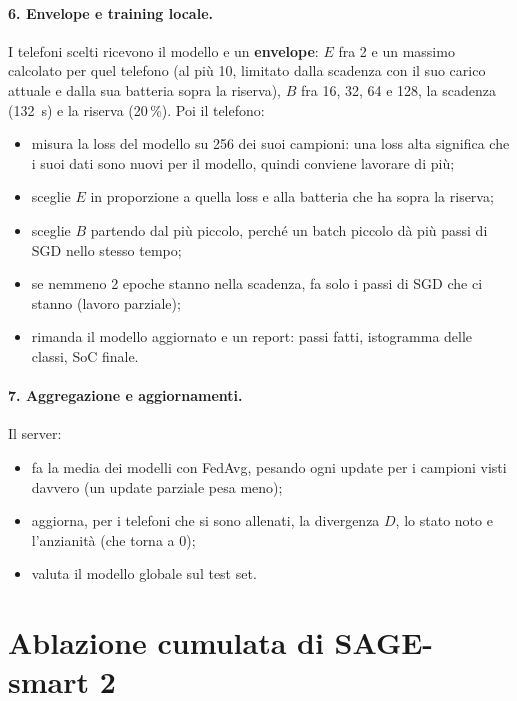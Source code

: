 \documentclass[11pt,a4paper]{article}
\begin{document}
\paragraph{6. Envelope e training locale.}
I telefoni scelti ricevono il modello e un \textbf{envelope}: $E$ fra 2 e un
massimo calcolato per quel telefono (al più 10, limitato dalla scadenza con il
suo carico attuale e dalla sua batteria sopra la riserva), $B$ fra 16, 32, 64
e 128, la scadenza (\SI{132}{s}) e la riserva (20\,\%). Poi il telefono:
\begin{itemize}
  \item misura la loss del modello su 256 dei suoi campioni: una loss alta
        significa che i suoi dati sono nuovi per il modello, quindi conviene
        lavorare di più;
  \item sceglie $E$ in proporzione a quella loss e alla batteria che ha sopra
        la riserva;
  \item sceglie $B$ partendo dal più piccolo, perché un batch piccolo dà più
        passi di SGD nello stesso tempo;
  \item se nemmeno 2 epoche stanno nella scadenza, fa solo i passi di SGD che
        ci stanno (lavoro parziale);
  \item rimanda il modello aggiornato e un report: passi fatti, istogramma
        delle classi, SoC finale.
\end{itemize}

\paragraph{7. Aggregazione e aggiornamenti.}
Il server:
\begin{itemize}
  \item fa la media dei modelli con FedAvg, pesando ogni update per i campioni
        visti davvero (un update parziale pesa meno);
  \item aggiorna, per i telefoni che si sono allenati, la divergenza $D$, lo
        stato noto e l'anzianità (che torna a 0);
  \item valuta il modello globale sul test set.
\end{itemize}

\newpage

\section{Ablazione cumulata di SAGE-smart 2}
\label{sec:ablation}
\end{document}
